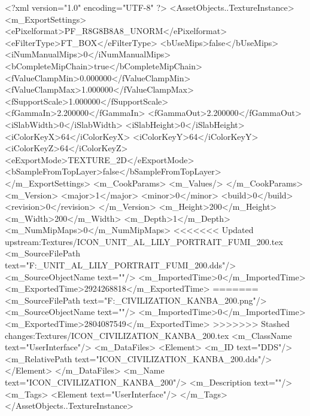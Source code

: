 <?xml version="1.0" encoding="UTF-8" ?>
<AssetObjects..TextureInstance>
	<m_ExportSettings>
		<ePixelformat>PF_R8G8B8A8_UNORM</ePixelformat>
		<eFilterType>FT_BOX</eFilterType>
		<bUseMips>false</bUseMips>
		<iNumManualMips>0</iNumManualMips>
		<bCompleteMipChain>true</bCompleteMipChain>
		<fValueClampMin>0.000000</fValueClampMin>
		<fValueClampMax>1.000000</fValueClampMax>
		<fSupportScale>1.000000</fSupportScale>
		<fGammaIn>2.200000</fGammaIn>
		<fGammaOut>2.200000</fGammaOut>
		<iSlabWidth>0</iSlabWidth>
		<iSlabHeight>0</iSlabHeight>
		<iColorKeyX>64</iColorKeyX>
		<iColorKeyY>64</iColorKeyY>
		<iColorKeyZ>64</iColorKeyZ>
		<eExportMode>TEXTURE_2D</eExportMode>
		<bSampleFromTopLayer>false</bSampleFromTopLayer>
	</m_ExportSettings>
	<m_CookParams>
		<m_Values/>
	</m_CookParams>
	<m_Version>
		<major>1</major>
		<minor>0</minor>
		<build>0</build>
		<revision>0</revision>
	</m_Version>
	<m_Height>200</m_Height>
	<m_Width>200</m_Width>
	<m_Depth>1</m_Depth>
	<m_NumMipMaps>0</m_NumMipMaps>
<<<<<<< Updated upstream:Textures/ICON_UNIT_AL_LILY_PORTRAIT_FUMI_200.tex
	<m_SourceFilePath text="F:\DT\lilyimages\gpportrait\ICON_UNIT_AL_LILY_PORTRAIT_FUMI_200.dds"/>
	<m_SourceObjectName text=""/>
	<m_ImportedTime>0</m_ImportedTime>
	<m_ExportedTime>2924268818</m_ExportedTime>
=======
	<m_SourceFilePath text="F:\DT\lilyimages\all\ICON_CIVILIZATION_KANBA_200.png"/>
	<m_SourceObjectName text=""/>
	<m_ImportedTime>0</m_ImportedTime>
	<m_ExportedTime>2804087549</m_ExportedTime>
>>>>>>> Stashed changes:Textures/ICON_CIVILIZATION_KANBA_200.tex
	<m_ClassName text="UserInterface"/>
	<m_DataFiles>
		<Element>
			<m_ID text="DDS"/>
			<m_RelativePath text="ICON_CIVILIZATION_KANBA_200.dds"/>
		</Element>
	</m_DataFiles>
	<m_Name text="ICON_CIVILIZATION_KANBA_200"/>
	<m_Description text=""/>
	<m_Tags>
		<Element text="UserInterface"/>
	</m_Tags>
</AssetObjects..TextureInstance>

